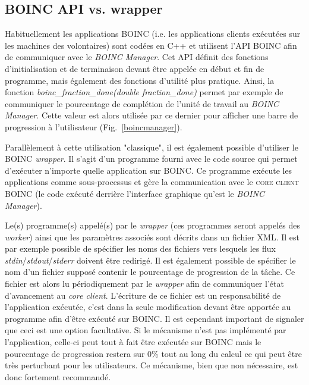 \documentclass[a4paper, 11pt]{report}
\begin{document}
\subsection{BOINC API vs. wrapper}
Habituellement les applications \textsc{BOINC} (i.e. les applications clients exécutées sur les machines des volontaires) sont codées en C++ et utilisent l'API \textsc{BOINC} afin de communiquer avec le \textit{BOINC Manager}. Cet API définit des fonctions d'initialisation et de terminaison devant être appelée en début et fin de programme, mais également des fonctions d'utilité plus pratique. Ainsi, la fonction \textit{boinc\_fraction\_done(double fraction\_done)} permet par exemple de communiquer le pourcentage de complétion de l'unité de travail au \textit{BOINC Manager}. Cette valeur est alors utilisée par ce dernier pour afficher une barre de progression à l'utilisateur (Fig.~\ref{boincmanager}). 

Parallèlement à cette utilisation "classique", il est également possible d'utiliser le \textsc{BOINC} \textit{wrapper}. Il s'agit d'un programme fourni avec le code source qui permet d'exécuter n'importe quelle application sur \textsc{BOINC}. Ce programme exécute les applications comme sous-processus et gère la communication avec le  \textsc{core client} \textsc{BOINC} (le code exécuté derrière l'interface graphique qu'est le \textit{BOINC Manager}).

Le(s) programme(s) appelé(s) par le \textit{wrapper} (ces programmes seront appelés des \textit{worker}) ainsi que les paramètres associés sont décrits dans un fichier XML. Il est par exemple possible de spécifier les noms des fichiers vers lesquels les flux \textit{stdin}/\textit{stdout}/\textit{stderr} doivent être redirigé. Il est également possible de spécifier le nom d'un fichier supposé contenir le pourcentage de progression de la tâche. Ce fichier est alors lu périodiquement par le \textit{wrapper} afin de communiquer l'état d'avancement au \textit{core client}. L'écriture de ce fichier est un responsabilité de l'application exécutée, c'est dans la seule modification devant être apportée au programme afin d'être exécuté sur \textsc{BOINC}. Il est cependant important de signaler que ceci est une option facultative. Si le mécanisme n'est pas implémenté par l'application, celle-ci peut tout à fait être exécutée sur \textsc{BOINC} mais le pourcentage de progression restera sur 0\% tout au long du calcul ce qui peut être très perturbant pour les utilisateurs. Ce mécanisme, bien que non nécessaire, est donc fortement recommandé.
\end{document}
